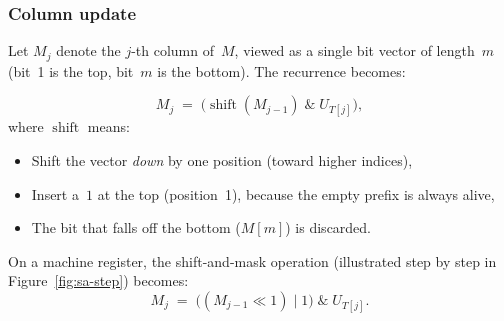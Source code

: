 \subsubsection*{Column update}

Let $M_j$ denote the $j$-th column of~$M$, viewed as a single bit vector of
length~$m$ (bit~1 is the top, bit~$m$ is the bottom).  The recurrence becomes:

\[
  M_j \;=\; \bigl(\operatorname{shift}(M_{j-1}) \;\mathbin{\texttt{\&}}\; U_{T[j]}\bigr),
\]
where $\operatorname{shift}$ means:
\begin{itemize}[nosep]
  \item Shift the vector \emph{down} by one position (toward higher indices),
  \item Insert a~$1$ at the top (position~1), because the empty prefix is
        always alive,
  \item The bit that falls off the bottom ($M[m]$) is discarded.
\end{itemize}


On a machine register, the shift-and-mask operation
(illustrated step by step in Figure~\ref{fig:sa-step}) becomes:
\[
  M_j \;=\; \bigl((M_{j-1} \ll 1) \mathbin{|} 1\bigr) \;\mathbin{\texttt{\&}}\; U_{T[j]}.
\]

